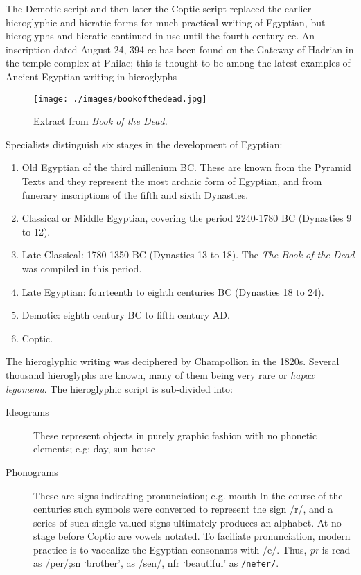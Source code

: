 The Demotic script and then later the Coptic script replaced the earlier hieroglyphic and
hieratic forms for much practical writing of Egyptian, but hieroglyphs and hieratic continued
in use until the fourth century ce. An inscription dated August 24, 394 ce has been
found on the Gateway of Hadrian in the temple complex at Philae; this is thought to be
among the latest examples of Ancient Egyptian writing in hieroglyphs

\begin{figure}[htb]
\texttt{[image: ./images/bookofthedead.jpg]}
\caption{Extract from \textit{Book of the Dead.}}
\end{figure}


Specialists distinguish six stages in the development of Egyptian:

\begin{enumerate}
\item Old Egyptian of the third millenium BC. These are known from the Pyramid Texts and they represent the most archaic form of Egyptian, and from funerary inscriptions of the fifth and sixth Dynasties.
\item Classical or Middle Egyptian, covering the period 2240-1780 BC (Dynasties 9 to 12).
\item Late Classical: 1780-1350 BC (Dynasties 13 to 18). The \textit{The Book of the Dead} was compiled in this period.
\item Late Egyptian: fourteenth to eighth centuries BC (Dynasties 18 to 24).
\item Demotic: eighth century BC to fifth century AD.
\item Coptic.
\end{enumerate}


The hieroglyphic writing was deciphered by Champollion in the 1820s. Several thousand hieroglyphs are known, many of them being very rare or \textit{hapax legomena}. The hieroglyphic script is sub-divided into:

\begin{description}
\item [Ideograms] These represent objects in purely graphic fashion with no phonetic elements; e.g:
day, sun
house

\item[Phonograms] These are signs indicating pronunciation; e.g. mouth In the course of the centuries such symbols were converted to represent the sign /r/, and a series of such single valued signs ultimately produces an alphabet. At no stage before Coptic are vowels notated. To faciliate pronunciation, modern practice is to vaocalize the Egyptian consonants with /e/. Thus, \textit{pr} is read as /per/;sn `brother', as /sen/, nfr `beautiful' as \texttt{/nefer/}.

\end{description}


